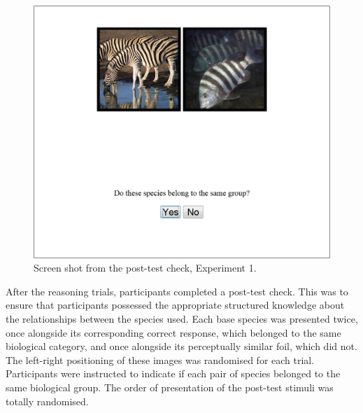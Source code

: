 \begin{figure}[pb]
  \centering
  \includegraphics[width=.7\textwidth]{imgs/exp1_posttest.png}
  \caption{Screen shot from the post-test check, Experiment 1.
    \label{fig:exp1-screenshot2}}
\end{figure}


After the reasoning trials, participants completed a post-test check.
This was to ensure that participants possessed the appropriate
structured knowledge about the relationships between
the species used.
Each base species was presented twice,
once alongside its corresponding correct response,
which belonged to the same biological category,
and once alongside its perceptually similar foil,
which did not.
The left-right positioning of these images
was randomised for each trial.
Participants were instructed to indicate
if each pair of species belonged to the same biological group.
The order of presentation of the post-test stimuli was totally randomised.
